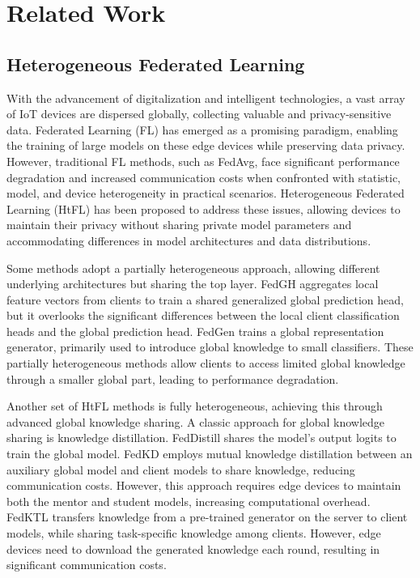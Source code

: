 \documentclass[journal]{IEEEtran}
\begin{document}
\section{Related Work}
\subsection{Heterogeneous Federated Learning}
With the advancement of digitalization and intelligent technologies, a vast array of IoT devices are dispersed globally, collecting valuable and privacy-sensitive data. Federated Learning (FL) has emerged as a promising paradigm, enabling the training of large models on these edge devices while preserving data privacy. However, traditional FL methods, such as FedAvg\cite{fedavg_google}, face significant performance degradation and increased communication costs when confronted with statistic, model, and device heterogeneity in practical scenarios. Heterogeneous Federated Learning (HtFL)\cite{tan_fedproto_2021} has been proposed to address these issues, allowing devices to maintain their privacy without sharing private model parameters and accommodating differences in model architectures and data distributions.

Some methods adopt a partially heterogeneous approach, allowing different underlying architectures but sharing the top layer. FedGH\cite{yi_fedgh_2023} aggregates local feature vectors from clients to train a shared generalized global prediction head, but it overlooks the significant differences between the local client classification heads and the global prediction head. FedGen\cite{zhu_data-free_fedgen_2021} trains a global representation generator, primarily used to introduce global knowledge to small classifiers. These partially heterogeneous methods allow clients to access limited global knowledge through a smaller global part, leading to performance degradation.

Another set of HtFL methods is fully heterogeneous, achieving this through advanced global knowledge sharing. A classic approach for global knowledge sharing is knowledge distillation. FedDistill\cite{jeong2018communication} shares the model's output logits to train the global model. FedKD \cite{wu2022communication} employs mutual knowledge distillation between an auxiliary global model and client models to share knowledge, reducing communication costs. However, this approach requires edge devices to maintain both the mentor and student models, increasing computational overhead. FedKTL\cite{zhang_upload-efficient_2024} transfers knowledge from a pre-trained generator on the server to client models, while sharing task-specific knowledge among clients. However, edge devices need to download the generated knowledge each round, resulting in significant communication costs.
\end{document}
